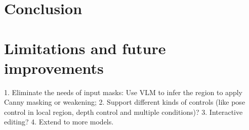 \documentclass{article}
\begin{document}







\section{Conclusion}

\section{Limitations and future improvements}
\label{Sec:limitation}
1. Eliminate the needs of input masks: Use VLM to infer the region to apply Canny masking or weakening;
2. Support different kinds of controls (like pose control in local region, depth control and multiple conditions)? 
3. Interactive editing?
4. Extend to more models.







\end{document}
